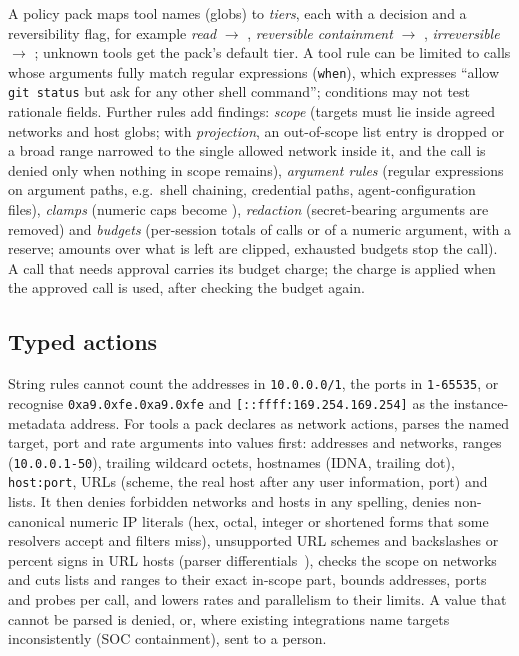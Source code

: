 A policy pack maps tool names (globs) to \emph{tiers}, each with a decision and a reversibility flag, for example \emph{read} $\to$ , \emph{reversible containment} $\to$ , \emph{irreversible} $\to$ ; unknown tools get the pack's default tier. A tool rule can be limited to calls whose arguments fully match regular expressions (\texttt{when}), which expresses ``allow \texttt{git status} but ask for any other shell command''; conditions may not test rationale fields. Further rules add findings: \emph{scope} (targets must lie inside agreed networks and host globs; with \emph{projection}, an out-of-scope list entry is dropped or a broad range narrowed to the single allowed network inside it, and the call is denied only when nothing in scope remains), \emph{argument rules} (regular expressions on argument paths, e.g.\ shell chaining, credential paths, agent-configuration files), \emph{clamps} (numeric caps become ), \emph{redaction} (secret-bearing arguments are removed) and \emph{budgets} (per-session totals of calls or of a numeric argument, with a reserve; amounts over what is left are clipped, exhausted budgets stop the call). A call that needs approval carries its budget charge; the charge is applied when the approved call is used, after checking the budget again.

\subsection{Typed actions}
String rules cannot count the addresses in \texttt{10.0.0.0/1}, the ports in \texttt{1-65535}, or recognise \texttt{0xa9.0xfe.0xa9.0xfe} and \texttt{[::ffff:169.254.169.254]} as the instance-metadata address. For tools a pack declares as network actions, \SystemName{} parses the named target, port and rate arguments into values first: addresses and networks, ranges (\texttt{10.0.0.1-50}), trailing wildcard octets, hostnames (IDNA, trailing dot), \texttt{host:port}, URLs (scheme, the real host after any user information, port) and lists. It then denies forbidden networks and hosts in any spelling, denies non-canonical numeric IP literals (hex, octal, integer or shortened forms that some resolvers accept and filters miss), unsupported URL schemes and backslashes or percent signs in URL hosts (parser differentials~\cite{orangetsai}), checks the scope on networks and cuts lists and ranges to their exact in-scope part, bounds addresses, ports and probes per call, and lowers rates and parallelism to their limits. A value that cannot be parsed is denied, or, where existing integrations name targets inconsistently (SOC containment), sent to a person.

